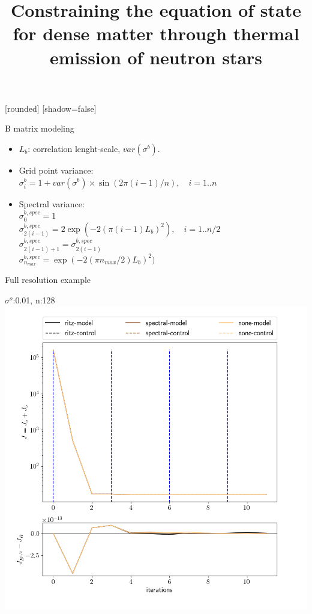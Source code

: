 \documentclass[francais]{beamer}
\title[Nicolas Baillot d'Etivaux]{Constraining the equation of state for dense matter through thermal emission of neutron stars}
\begin{document}
[rounded]%
[shadow=false]


\begin{frame}{B matrix modeling}
 \begin{itemize}
  \item $L_b$: correlation lenght-scale, $var(\sigma^b)$.
  \item Grid point variance:\\
  $\sigma^b_i=1+var(\sigma^b)\times \sin(2\pi(i-1)/n), \quad i=1..n$
  \vspace{+0.5cm}
  \item Spectral variance:\\
  $\sigma^{b,spec}_0=1$\\
  $\sigma^{b,spec}_{2(i-1)}=2 \exp(-2(\pi(i-1)L_b)^2), \quad i=1..n/2$\\
  $\sigma^{b,spec}_{2(i-1)+1}=\sigma^{b,spec}_{2(i-1)}$\\
  $\sigma^{b,spec}_{n_{max}}=\exp(-2(\pi n_{max}/2)L_b)^2)$\\
 \end{itemize}
\end{frame}




\begin{frame}{Full resolution example}
\begin{center}
$\sigma^o$:0.01, n:128\\
 \includegraphics[scale=0.3]{./images/im1.png}
\end{center}
\end{frame}
\end{document}
